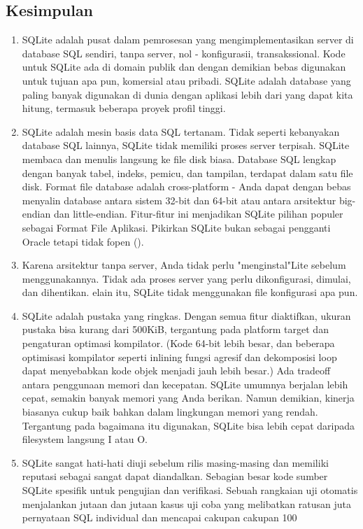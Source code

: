 \begin{enumerate}
		\subsection{Kesimpulan}
			\begin{enumerate}
				\item SQLite adalah pusat dalam pemrosesan yang mengimplementasikan server di database SQL sendiri, tanpa server, nol - konfigurasii, transakssional. Kode untuk SQLite ada di domain publik dan dengan demikian bebas digunakan untuk tujuan apa pun, komersial atau pribadi. SQLite adalah database yang paling banyak digunakan di dunia dengan aplikasi lebih dari yang dapat kita hitung, termasuk beberapa proyek profil tinggi.
				\item SQLite adalah mesin basis data SQL tertanam. Tidak seperti kebanyakan database SQL lainnya, SQLite tidak memiliki proses server terpisah. SQLite membaca dan menulis langsung ke file disk biasa. Database SQL lengkap dengan banyak tabel, indeks, pemicu, dan tampilan, terdapat dalam satu file disk. Format file database adalah cross-platform - Anda dapat dengan bebas menyalin database antara sistem 32-bit dan 64-bit atau antara arsitektur big-endian dan little-endian. Fitur-fitur ini menjadikan SQLite pilihan populer sebagai Format File Aplikasi. Pikirkan SQLite bukan sebagai pengganti Oracle tetapi tidak fopen ().
				\item Karena arsitektur tanpa server, Anda tidak perlu "menginstal"Lite sebelum menggunakannya. Tidak ada proses server yang perlu dikonfigurasi, dimulai, dan dihentikan. elain itu, SQLite tidak menggunakan file konfigurasi apa pun.
				\item SQLite adalah pustaka yang ringkas. Dengan semua fitur diaktifkan, ukuran pustaka bisa kurang dari 500KiB, tergantung pada platform target dan pengaturan optimasi kompilator. (Kode 64-bit lebih besar, dan beberapa optimisasi kompilator seperti inlining fungsi agresif dan dekomposisi loop dapat menyebabkan kode objek menjadi jauh lebih besar.) Ada tradeoff antara penggunaan memori dan kecepatan. SQLite umumnya berjalan lebih cepat, semakin banyak memori yang Anda berikan. Namun demikian, kinerja biasanya cukup baik bahkan dalam lingkungan memori yang rendah. Tergantung pada bagaimana itu digunakan, SQLite bisa lebih cepat daripada filesystem langsung I atau O.
				\item SQLite sangat hati-hati diuji sebelum rilis masing-masing dan memiliki reputasi sebagai sangat dapat diandalkan. Sebagian besar kode sumber SQLite spesifik untuk pengujian dan verifikasi. Sebuah rangkaian uji otomatis menjalankan jutaan dan jutaan kasus uji coba yang melibatkan ratusan juta pernyataan SQL individual dan mencapai cakupan cakupan 100%

\end{enumerate}
\end{enumerate}
